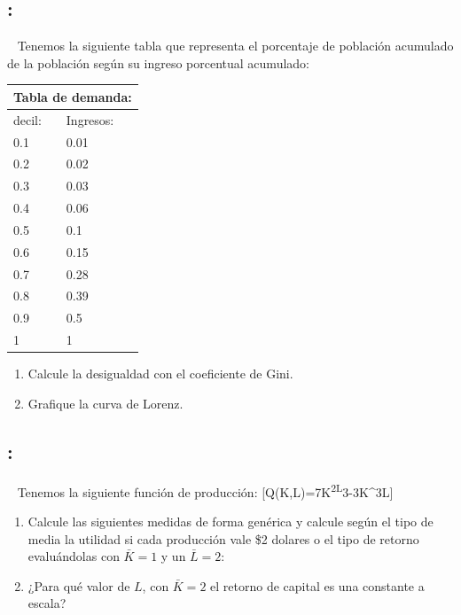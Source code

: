 \documentclass[
  letterpaper,
  DIV=11,
  numbers=noendperiod]{scrreport}
\begin{document}
\hypertarget{section-17}{%
\subsection{:}\label{section-17}}

~ Tenemos la siguiente tabla que representa el porcentaje de población
acumulado de la población según su ingreso porcentual acumulado:

\begin{table}[H]
    \centering
    \begin{tabular}{|p{25mm}|p{25mm}|}
        \multicolumn{2}{c}{Tabla de demanda:} \\
        \hline
        decil: & Ingresos: \\ \hline
        0.1 & 0.01 \\ \hline
        0.2 & 0.02 \\ \hline
        0.3 & 0.03 \\ \hline
        0.4 & 0.06 \\ \hline
        0.5 & 0.1 \\ \hline
        0.6 & 0.15 \\ \hline
        0.7 & 0.28 \\ \hline
        0.8 & 0.39 \\ \hline
        0.9 & 0.5 \\ \hline
        1 & 1 \\ \hline
        \end{tabular}
\end{table}

\begin{enumerate}
\def\labelenumi{\arabic{enumi})}
\item
  Calcule la desigualdad con el coeficiente de Gini.
\item
  Grafique la curva de Lorenz.
\end{enumerate}

\hypertarget{section-18}{%
\subsection{:}\label{section-18}}

~ Tenemos la siguiente función de producción:
{[}Q(K,L)=7K\textsuperscript{2L}3-3K\^{}3L{]}

\begin{enumerate}
\def\labelenumi{\arabic{enumi})}
\item
  Calcule las siguientes medidas de forma genérica y calcule según el
  tipo de media la utilidad si cada producción vale \$2 dolares o el
  tipo de retorno evaluándolas con \(\bar{K}=1\) y un \(\bar{L}=2\):
\item
  ¿Para qué valor de \(L\), con \(\bar{K}=2\) el retorno de capital es
  una constante a escala?
\end{enumerate}
\end{document}
